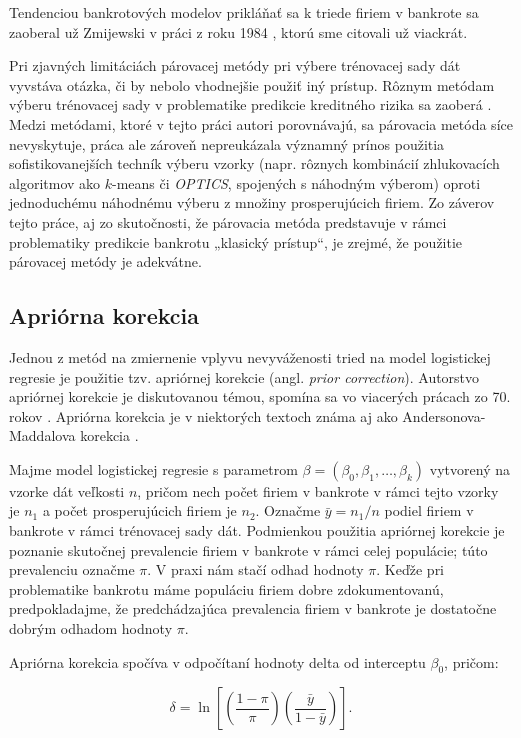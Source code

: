 Tendenciou bankrotových modelov prikláňať sa k triede firiem v bankrote sa zaoberal už Zmijewski v práci z roku 1984 \cite{zmijewski}, ktorú sme citovali už viackrát.

Pri zjavných limitáciách párovacej metódy pri výbere trénovacej sady dát vyvstáva otázka, či by nebolo vhodnejšie použiť iný prístup.
Rôznym metódam výberu trénovacej sady v problematike predikcie kreditného rizika sa zaoberá \cite{protopapadakis}.
Medzi metódami, ktoré v tejto práci autori porovnávajú, sa párovacia metóda síce nevyskytuje, práca ale zároveň nepreukázala významný prínos použitia sofistikovanejších techník výberu vzorky
(napr. rôznych kombinácií zhlukovacích algoritmov ako \(k\)-means či \emph{OPTICS}, spojených s náhodným výberom) oproti jednoduchému náhodnému výberu z množiny prosperujúcich firiem.
Zo záverov tejto práce, aj zo skutočnosti, že párovacia metóda predstavuje v rámci problematiky predikcie bankrotu „klasický prístup“, je zrejmé, že použitie párovacej metódy je adekvátne.

\subsection{Apriórna korekcia}

Jednou z metód na zmiernenie vplyvu nevyváženosti tried na model logistickej regresie je použitie tzv. apriórnej korekcie (angl. \emph{prior correction}).
Autorstvo apriórnej korekcie je diskutovanou témou, spomína sa vo viacerých prácach zo 70. rokov \cite{manski, bishop, anderson}.
Apriórna korekcia je v niektorých textoch známa aj ako Andersonova-Maddalova korekcia \cite{maddala}.

Majme model logistickej regresie s parametrom \(\beta = (\beta_0, \beta_1, \ldots, \beta_k) \) vytvorený na vzorke dát veľkosti \(n\),
pričom nech počet firiem v bankrote v rámci tejto vzorky je \(n_1\) a počet prosperujúcich firiem je \(n_2\).
Označme \( \bar{y} = n_1/n \) podiel firiem v bankrote v rámci trénovacej sady dát.
Podmienkou použitia apriórnej korekcie je poznanie skutočnej prevalencie firiem v bankrote v rámci celej populácie; túto prevalenciu označme \(\pi\).
V praxi nám stačí odhad hodnoty \(\pi\).
Keďže pri problematike bankrotu máme populáciu firiem dobre zdokumentovanú, predpokladajme, že predchádzajúca prevalencia firiem v bankrote je dostatočne dobrým odhadom hodnoty \(\pi\).

Apriórna korekcia spočíva v odpočítaní hodnoty delta od interceptu \(\beta_0\), pričom:

\[
    \delta = \ln \left[ \left( \frac{1 - \pi}{\pi} \right) \left( \frac{\bar{y}}{1 - \bar{y}} \right) \right].
\]

